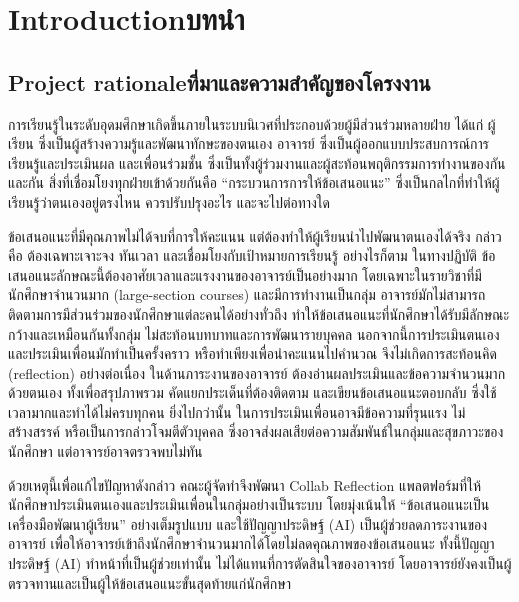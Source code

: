 \chapter{\ifenglish Introduction\else บทนำ\fi}\label{ch:intro}

\section{\ifenglish Project rationale\else ที่มาและความสำคัญของโครงงาน\fi}

การเรียนรู้ในระดับอุดมศึกษาเกิดขึ้นภายในระบบนิเวศที่ประกอบด้วยผู้มีส่วนร่วมหลายฝ่าย ได้แก่ ผู้เรียน ซึ่งเป็นผู้สร้างความรู้และพัฒนาทักษะของตนเอง อาจารย์ ซึ่งเป็นผู้ออกแบบประสบการณ์การเรียนรู้และประเมินผล และเพื่อนร่วมชั้น ซึ่งเป็นทั้งผู้ร่วมงานและผู้สะท้อนพฤติกรรมการทำงานของกันและกัน สิ่งที่เชื่อมโยงทุกฝ่ายเข้าด้วยกันคือ ``กระบวนการการให้ข้อเสนอแนะ'' ซึ่งเป็นกลไกที่ทำให้ผู้เรียนรู้ว่าตนเองอยู่ตรงไหน ควรปรับปรุงอะไร และจะไปต่อทางใด

ข้อเสนอแนะที่มีคุณภาพไม่ได้จบที่การให้คะแนน แต่ต้องทำให้ผู้เรียนนำไปพัฒนาตนเองได้จริง กล่าวคือ ต้องเฉพาะเจาะจง ทันเวลา และเชื่อมโยงกับเป้าหมายการเรียนรู้ อย่างไรก็ตาม ในทางปฏิบัติ ข้อเสนอแนะลักษณะนี้ต้องอาศัยเวลาและแรงงานของอาจารย์เป็นอย่างมาก โดยเฉพาะในรายวิชาที่มีนักศึกษาจำนวนมาก (large-section courses) และมีการทำงานเป็นกลุ่ม อาจารย์มักไม่สามารถติดตามการมีส่วนร่วมของนักศึกษาแต่ละคนได้อย่างทั่วถึง ทำให้ข้อเสนอแนะที่นักศึกษาได้รับมีลักษณะกว้างและเหมือนกันทั้งกลุ่ม ไม่สะท้อนบทบาทและการพัฒนารายบุคคล นอกจากนี้การประเมินตนเองและประเมินเพื่อนมักทำเป็นครั้งคราว หรือทำเพียงเพื่อนำคะแนนไปคำนวณ จึงไม่เกิดการสะท้อนคิด (reflection) อย่างต่อเนื่อง ในด้านภาระงานของอาจารย์ ต้องอ่านผลประเมินและข้อความจำนวนมากด้วยตนเอง ทั้งเพื่อสรุปภาพรวม คัดแยกประเด็นที่ต้องติดตาม และเขียนข้อเสนอแนะตอบกลับ ซึ่งใช้เวลามากและทำได้ไม่ครบทุกคน ยิ่งไปกว่านั้น ในการประเมินเพื่อนอาจมีข้อความที่รุนแรง ไม่สร้างสรรค์ หรือเป็นการกล่าวโจมตีตัวบุคคล ซึ่งอาจส่งผลเสียต่อความสัมพันธ์ในกลุ่มและสุขภาวะของนักศึกษา แต่อาจารย์อาจตรวจพบไม่ทัน

ด้วยเหตุนี้เพื่อแก้ไขปัญหาดังกล่าว คณะผู้จัดทำจึงพัฒนา Collab Reflection แพลตฟอร์มที่ให้นักศึกษาประเมินตนเองและประเมินเพื่อนในกลุ่มอย่างเป็นระบบ โดยมุ่งเน้นให้ ``ข้อเสนอแนะเป็นเครื่องมือพัฒนาผู้เรียน'' อย่างเต็มรูปแบบ และใช้ปัญญาประดิษฐ์ (AI) เป็นผู้ช่วยลดภาระงานของอาจารย์ เพื่อให้อาจารย์เข้าถึงนักศึกษาจำนวนมากได้โดยไม่ลดคุณภาพของข้อเสนอแนะ ทั้งนี้ปัญญาประดิษฐ์ (AI) ทำหน้าที่เป็นผู้ช่วยเท่านั้น ไม่ได้แทนที่การตัดสินใจของอาจารย์ โดยอาจารย์ยังคงเป็นผู้ตรวจทานและเป็นผู้ให้ข้อเสนอแนะขั้นสุดท้ายแก่นักศึกษา


